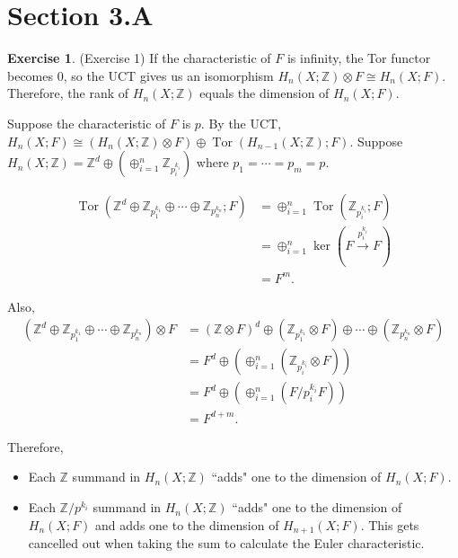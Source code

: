 \documentclass[12pt, psamsfonts]{amsart}
\theoremstyle{definition}
\newtheorem*{exer}{Exercise}
\theoremstyle{remark}
\DeclareMathOperator{\Tor}{Tor}
\numberwithin{equation}{section}
\begin{document}
\section{Section 3.A}

\begin{exer}{(Exercise 1)}
  If the characteristic of $F$ is infinity, the Tor functor becomes 0, so the UCT gives us an isomorphism $H_n(X; \mathbb{Z}) \otimes F \cong H_n(X; F)$.
  Therefore, the rank of $H_n(X; \mathbb{Z})$ equals the dimension of $H_n(X; F)$.

  Suppose the characteristic of $F$ is $p$.
  By the UCT, $H_n(X; F) \cong (H_n(X; \mathbb{Z}) \otimes F) \oplus \Tor(H_{n - 1}(X; \mathbb{Z}); F)$.
  Suppose $H_n(X; \mathbb{Z}) = \mathbb{Z}^d \oplus (\oplus_{i=1}^{n} \mathbb{Z}_{p_i^{k_i}})$ where $p_1 = \cdots = p_m = p$.

  \begin{align*}
    \Tor(\mathbb{Z}^d \oplus \mathbb{Z}_{p_1^{k_1}} \oplus \cdots \oplus \mathbb{Z}_{p_n^{k_n}}; F)
      &= \oplus_{i=1}^{n} \Tor(\mathbb{Z}_{p_i^{k_i}}; F) \\
      &= \oplus_{i=1}^{n} \ker(F \xrightarrow{p_i^{k_i}} F) \\
      &= F^m.
  \end{align*}

  Also,
  \begin{align*}
    (\mathbb{Z}^d \oplus \mathbb{Z}_{p_1^{k_1}} \oplus \cdots \oplus \mathbb{Z}_{p_n^{k_n}}) \otimes F
      &= (\mathbb{Z} \otimes F)^d \oplus (\mathbb{Z}_{p_1^{k_1}} \otimes F) \oplus \cdots \oplus (\mathbb{Z}_{p_n^{k_n}} \otimes F) \\
      &= F^d \oplus (\oplus_{i=1}^{n} (\mathbb{Z}_{p_i^{k_i}} \otimes F)) \\
      &= F^d \oplus (\oplus_{i=1}^{n} (F / p_i^{k_i}F)) \\
      &= F^{d + m}.
  \end{align*}

  Therefore,
  \begin{itemize}
    \item
      Each $\mathbb{Z}$ summand in $H_n(X; \mathbb{Z})$ ``adds" one to the dimension of $H_n(X; F)$.
    \item
      Each $\mathbb{Z} / p^{k_i}$ summand in $H_n(X; \mathbb{Z})$ ``adds" one to the dimension of $H_n(X; F)$ and adds one to the dimension of $H_{n + 1}(X; F)$.
      This gets cancelled out when taking the sum to calculate the Euler characteristic.
  \end{itemize}
\end{exer}
\end{document}
